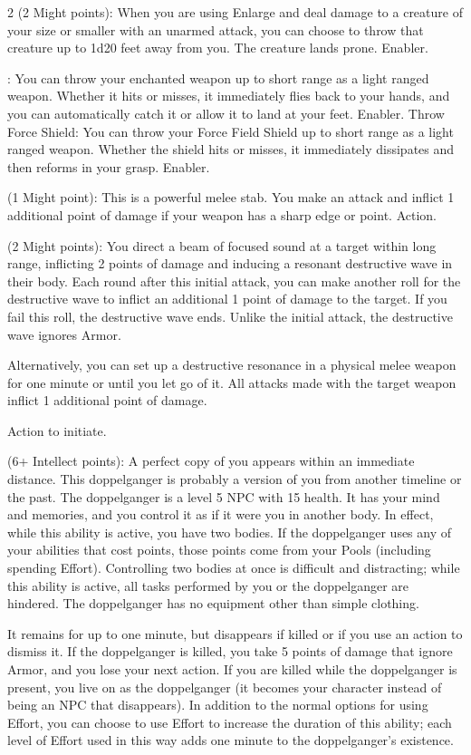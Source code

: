 \begin{multicols}{2}
 (2 Might points): When you are using Enlarge and deal damage to a creature of your size or smaller with an unarmed attack, you can choose to throw that creature up to 1d20 feet away from you. The creature lands prone. Enabler. 
 
: You can throw your enchanted weapon up to short range as a light ranged weapon. Whether it hits or misses, it immediately flies back to your hands, and you can automatically catch it or allow it to land at your feet. Enabler.
Throw Force Shield: You can throw your Force Field Shield up to short range as a light ranged weapon. Whether the shield hits or misses, it immediately dissipates and then reforms in your grasp. Enabler. 
 
 (1 Might point): This is a powerful melee stab. You make an attack and inflict 1 additional point of damage if your weapon has a sharp edge or point. Action. 
 
 (2 Might points): You direct a beam of focused sound at a target within long range, inflicting 2 points of damage and inducing a resonant destructive wave in their body. Each round after this initial attack, you can make another roll for the destructive wave to inflict an additional 1 point of damage to the target. If you fail this roll, the destructive wave ends. Unlike the initial attack, the destructive wave ignores Armor. 

Alternatively, you can set up a destructive resonance in a physical melee weapon for one minute or until you let go of it. All attacks made with the target weapon inflict 1 additional point of damage. 

Action to initiate. 
 
 (6+ Intellect points): A perfect copy of you appears within an immediate distance. This doppelganger is probably a version of you from another timeline or the past. The doppelganger is a level 5 NPC with 15 health. It has your mind and memories, and you control it as if it were you in another body. In effect, while this ability is active, you have two bodies. 
If the doppelganger uses any of your abilities that cost points, those points come from your Pools (including spending Effort). Controlling two bodies at once is difficult and distracting; while this ability is active, all tasks performed by you or the doppelganger are hindered. The doppelganger has no equipment other than simple clothing. 

It remains for up to one minute, but disappears if killed or if you use an action to dismiss it. If the doppelganger is killed, you take 5 points of damage that ignore Armor, and you lose your next action. If you are killed while the doppelganger is present, you live on as the doppelganger (it becomes your character instead of being an NPC that disappears). In addition to the normal options for using Effort, you can choose to use Effort to increase the duration of this ability; each level of Effort used in this way adds one minute to the doppelganger’s existence. 


\end{multicols}
